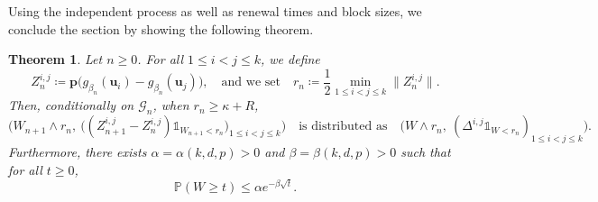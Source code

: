\documentclass[a4paper, 11pt]{article}
\theoremstyle{plain}
\newtheorem{Theorem}{Theorem}[section]
\theoremstyle{definition}
\renewcommand{\P}{\mathbb{P}}
\numberwithin{equation}{section}
\begin{document}
Using the independent process as well as renewal times and block sizes, we conclude the section by showing the following theorem.


\begin{Theorem}
    \label{thm_renewal_decomposition}
    Let $n\geq 0$. For all $1\leq i<j\leq k$, we define
        \[Z_n^{i, j}\coloneqq \mathbf p\big(g_{\beta_n}(\mathbf u_i)-g_{\beta_n}(\mathbf u_j)\big),\quad\text{and we set}\quad r_n\coloneqq\frac{1}{2}\min_{1\leq i<j\leq k}\|Z_n^{i,j}\|.\]
    Then, conditionally on $\mathcal G_n$, when $r_n\geq \kappa+R$,
        \[\big(W_{n+1}\wedge r_n,~\big((Z^{i,j}_{n+1}-Z^{i,j}_n)\mathds 1_{W_{n+1}<r_n}\big)_{1\leq i<j\leq k}\big)\quad\text{is distributed as}\quad\big(W\wedge r_n,~(\Delta^{i,j}\mathds 1_{W<r_n})_{1\leq i<j\leq k}\big).\]
    Furthermore, there exists $\alpha=\alpha(k, d, p)>0$ and $\beta=\beta(k, d, p)>0$ such that for all $t\geq0$,
        \[\P(W\geq t)\leq\alpha e^{-\beta \sqrt t}.\]
\end{Theorem}
\end{document}
